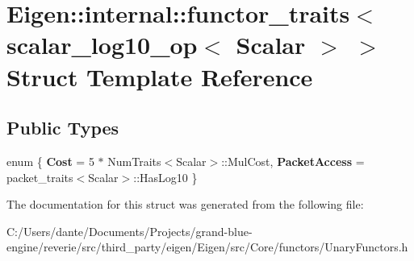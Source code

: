 \hypertarget{struct_eigen_1_1internal_1_1functor__traits_3_01scalar__log10__op_3_01_scalar_01_4_01_4}{}\section{Eigen\+::internal\+::functor\+\_\+traits$<$ scalar\+\_\+log10\+\_\+op$<$ Scalar $>$ $>$ Struct Template Reference}
\label{struct_eigen_1_1internal_1_1functor__traits_3_01scalar__log10__op_3_01_scalar_01_4_01_4}
\subsection*{Public Types}
\begin{DoxyCompactItemize}
\item 
\mbox{\label{struct_eigen_1_1internal_1_1functor__traits_3_01scalar__log10__op_3_01_scalar_01_4_01_4_a8554db18ce88cc89d49eff6d2f57f758}} 
enum \{ {\bfseries Cost} = 5 $\ast$ Num\+Traits$<$Scalar$>$\+::Mul\+Cost, 
{\bfseries Packet\+Access} = packet\+\_\+traits$<$Scalar$>$\+::Has\+Log10
 \}
\end{DoxyCompactItemize}


The documentation for this struct was generated from the following file\+:\begin{DoxyCompactItemize}
\item 
C\+:/\+Users/dante/\+Documents/\+Projects/grand-\/blue-\/engine/reverie/src/third\+\_\+party/eigen/\+Eigen/src/\+Core/functors/Unary\+Functors.\+h\end{DoxyCompactItemize}
